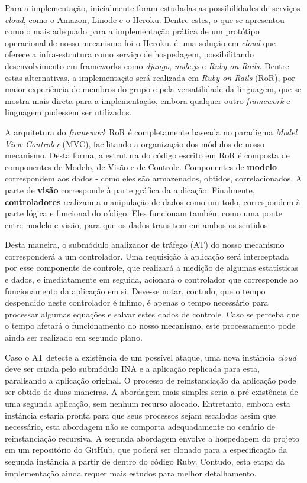 Para a implementação, inicialmente foram estudadas as possibilidades de serviços \emph{cloud}, como o Amazon, Linode e o Heroku. Dentre estes, o que se apresentou como o mais adequado para a implementação prática de um protótipo operacional de nosso mecanismo foi o Heroku. \cite{heroku} é uma solução em \emph{cloud} que oferece a infra-estrutura como serviço de hospedagem, possibilitando desenvolvimento em frameworks como \emph{django}, \emph{node.js} e \emph{Ruby on Rails}. Dentre estas alternativas, a implementação será realizada em \emph{Ruby on Rails} (RoR), por maior experiência de membros do grupo e pela versatilidade da linguagem, que se mostra mais direta para a implementação, embora qualquer outro \emph{framework} e linguagem pudessem ser utilizados.

A arquitetura do \emph{framework} RoR é completamente baseada no paradigma \emph{Model View Controler} (MVC), facilitando a organização dos módulos de nosso mecanismo. Desta forma, a estrutura do código escrito em RoR é composta de componentes de Modelo, de Visão e de Controle. Componentes de \textbf{modelo} correspondem aos dados - como eles são armazenados, obtidos, correlacionados. A parte de \textbf{visão} corresponde à parte gráfica da aplicação. Finalmente, \textbf{controladores} realizam a manipulação de dados como um todo, correspondem à parte lógica e funcional do código. Eles funcionam também como uma ponte entre modelo e visão, para que os dados transitem em ambos os sentidos.

Desta maneira, o submódulo analizador de tráfego (AT) do nosso mecanismo corresponderá a um controlador. Uma requisição à aplicação será interceptada por esse componente de controle, que realizará a medição de algumas estatísticas e dados, e imediatamente em seguida, acionará o controlador que corresponde ao funcionamento da aplicação em si. Deve-se notar, contudo, que o tempo despendido neste controlador é ínfimo, é apenas o tempo necessário para processar algumas equações e salvar estes dados de controle. Caso se perceba que o tempo afetará o funcionamento do nosso mecanismo, este processamento pode ainda ser realizado em segundo plano.

Caso o AT detecte a existência de um possível ataque, uma nova instância \emph{cloud} deve ser criada pelo submódulo INA e a aplicação replicada para esta, paralisando a aplicação original. O processo de reinstanciação da aplicação pode ser obtido de duas maneiras. A abordagem mais simples seria a pré existência de uma segunda aplicação, sem nenhum recurso alocado. Entretanto, embora esta instância estaria pronta para que seus processos sejam escalados assim que necessário, esta abordagem não se comporta adequadamente no cenário de reinstanciação recursiva. A segunda abordagem envolve a hospedagem do projeto em um repositório do GitHub, que poderá ser clonado para a especificação da segunda instância a partir de dentro do código Ruby. Contudo, esta etapa da implementação ainda requer mais estudos para melhor detalhamento.


